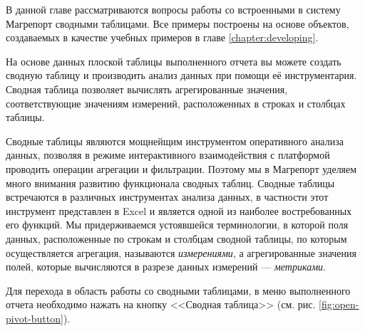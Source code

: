 \documentclass[../user-manual.tex]{subfiles}
\begin{document}
	В данной главе рассматриваются вопросы работы со встроенными в систему Магрепорт сводными таблицами. Все примеры построены на основе объектов, создаваемых в качестве учебных примеров в главе \ref{chapter:developing}.
	
	На основе данных плоской таблицы выполненного отчета вы можете создать сводную таблицу и производить анализ данных при помощи её инструментария. Сводная таблица позволяет вычислять агрегированные значения, соответствующие значениям измерений, расположенных в строках и столбцах таблицы.
	
	\begin{concept}
		Сводные таблицы являются мощнейщим инструментом оперативного анализа данных, позволяя в режиме интерактивного взаимодействия с платформой проводить операции агрегации и фильтрации. Поэтому мы в Магрепорт уделяем много внимания развитию функционала сводных таблиц. Сводные таблицы встречаются в различных инструментах анализа данных, в частности этот инструмент представлен в Excel и является одной из наиболее востребованных его функций. Мы придерживаемся устоявшейся терминологии, в которой поля данных, расположенные по строкам и столбцам сводной таблицы, по которым осуществляется агрегация, называются \textit{измерениями}, а агрегированные значения полей, которые вычисляются в разрезе данных измерений --- \textit{метриками}.
	\end{concept}
	
%		
%				
%						
%			
%			
%			
	
	Для перехода в область работы со сводными таблицами, в меню выполненного отчета необходимо нажать на кнопку <<Сводная таблица>> (см. рис. \ref{fig:open-pivot-button}).
	
\end{document}
